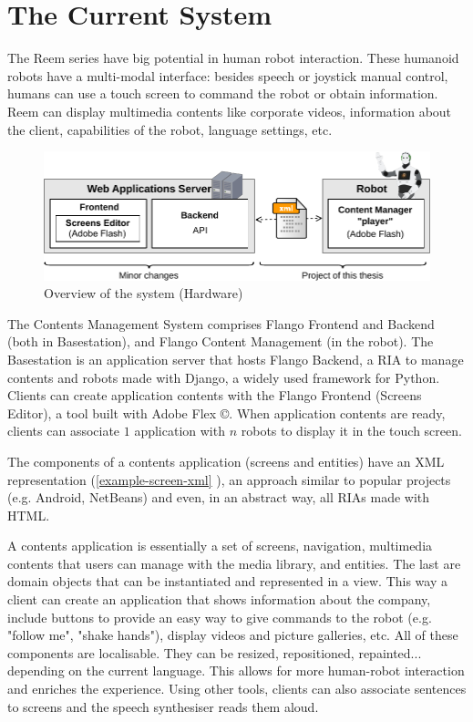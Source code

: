 \section{The Current System}
The Reem series have big potential in human robot interaction. 
These humanoid robots have a multi-modal interface: besides speech or joystick manual control, humans can use a touch screen to command the robot or obtain information.
Reem can display multimedia contents like corporate videos, information about the client, capabilities of the robot, language settings, etc.

\begin{figure}[htb]
    \label{fig:intro-system-overview}
    \centering
    \includegraphics[width=14cm]{figures/intro-system-overview}
    \caption{Overview of the system (Hardware)}
\end{figure}



The Contents Management System comprises Flango Frontend and Backend (both in Basestation), and Flango Content Management (in the robot).
The Basestation is an application server that hosts Flango Backend, a \ac{RIA} to manage contents and robots made with Django, a widely used framework for Python. 
Clients can create application contents with the Flango Frontend (Screens Editor), a tool built with Adobe Flex \copyright.
When application contents are ready, clients can associate $1$ application with $n$ robots to display it in the touch screen.



The components of a contents application (screens and entities) have an \ac{XML} representation (\ref{example-screen-xml} ), an approach similar to popular projects (e.g. Android, NetBeans) and even, in an abstract way, all \acp{RIA} made with \ac{HTML}.

A contents application is essentially a set of screens, navigation, multimedia contents that users can manage with the media library, and entities. 
The last are domain objects that can be instantiated and represented in a view. 
This way a client can create an application that shows information about the company, include buttons to provide an easy way to give commands to the robot (e.g. "follow me", "shake hands"), display videos and picture galleries, etc.
All of these components are localisable. 
They can be resized, repositioned, repainted... depending on the current language.
This allows for more human-robot interaction and enriches the experience. 
Using other tools, clients can also associate sentences to screens and the speech synthesiser reads them aloud.

